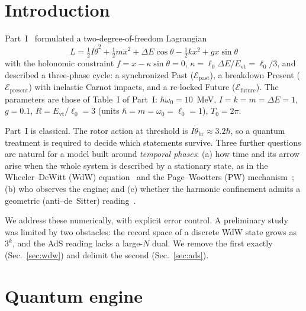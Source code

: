 \documentclass[aps,prc,twocolumn,superscriptaddress,amsmath,amssymb,nofootinbib]{revtex4-2}
\newcommand{\Epast}{\mathcal{E}_{\text{past}}}
\newcommand{\Epres}{\mathcal{E}_{\text{present}}}
\newcommand{\Efut}{\mathcal{E}_{\text{future}}}
\begin{document}
\maketitle

\section{Introduction}
Part~I~\cite{PartI} formulated a two-degree-of-freedom Lagrangian
\begin{equation}
L=\tfrac12I\dot\theta^2+\tfrac12m\dot x^2+\Delta E\cos\theta-\tfrac12kx^2+gx\sin\theta
\label{eq:L}
\end{equation}
with the holonomic constraint $f=x-\kappa\sin\theta=0$, $\kappa=\ell_0\Delta E/E_{\text{vt}}=\ell_0/3$, and described a three-phase cycle: a synchronized Past ($\Epast$), a breakdown Present ($\Epres$) with inelastic Carnot impacts, and a re-locked Future ($\Efut$). The parameters are those of Table~I of Part~I: $\hbar\omega_0=10$~MeV, $I=k=m=\Delta E=1$, $g=0.1$, $R=E_{\text{vt}}/\ell_0=3$ (units $\hbar=m=\omega_0=\ell_0=1$), $T_0=2\pi$.

Part~I is classical. The rotor action at threshold is $I\dot\theta_{\text{br}}\approx3.2\hbar$, so a quantum treatment is required to decide which statements survive. Three further questions are natural for a model built around \emph{temporal phases}: (a) how time and its arrow arise when the whole system is described by a stationary state, as in the Wheeler--DeWitt (WdW) equation~\cite{DeWitt1967} and the Page--Wootters (PW) mechanism~\cite{PageWootters1983,GLM2015,Moreva2014}; (b) who observes the engine; and (c) whether the harmonic confinement admits a geometric (anti--de~Sitter) reading~\cite{Maldacena1998}.

We address these numerically, with explicit error control. A preliminary study was limited by two obstacles: the record space of a discrete WdW state grows as $3^k$, and the AdS reading lacks a large-$N$ dual. We remove the first exactly (Sec.~\ref{sec:wdw}) and delimit the second (Sec.~\ref{sec:ads}).

\section{Quantum engine}
\label{sec:quantum}
\end{document}
